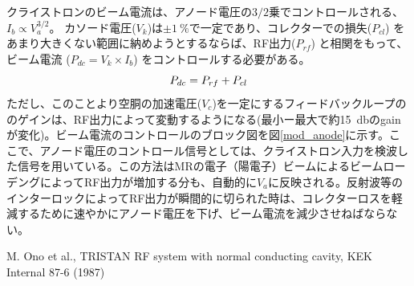 \documentclass[article]{jlreq}
\begin{document}
クライストロンのビーム電流は、アノード電圧の$3/2$乗でコントロールされる、$I_b \propto V_a^{3/2}$。 カソード電圧($V_k$)は$\pm\qty{1}{\percent}$で一定であり、コレクターでの損失($P_{cl}$) をあまり大きくない範囲に納めようとするならば、RF出力($P_{rf}$) と相関をもって、ビーム電流 ($P_{dc} = V_k\times I_b$) をコントロールする必要がある。
%
\begin{equation}
    P_{dc} = P_{rf} + P_{cl} \notag
\end{equation}
%
ただし、このことより空胴の加速電圧($V_c$)を一定にするフィードバックループののゲインは、RF出力によって変動するようになる(最小ー最大で約\qty{15}{\decibel}のgainが変化)。ビーム電流のコントロールのブロック図を図\ref{mod_anode}に示す。ここで、アノード電圧のコントロール信号としては、クライストロン入力を検波した信号を用いている。この方法はMRの電子（陽電子）ビームによるビームローデングによってRF出力が増加する分も、自動的に$V_a$に反映される。反射波等のインターロックによってRF出力が瞬間的に切られた時は、コレクターロスを軽減するために速やかにアノード電圧を下げ、ビーム電流を減少させねばならない。

\begin{thebibliography}{9}
    M. Ono et al., TRISTAN RF system with normal conducting cavity, KEK Internal 87-6 (1987)
\end{thebibliography}
\end{document}
